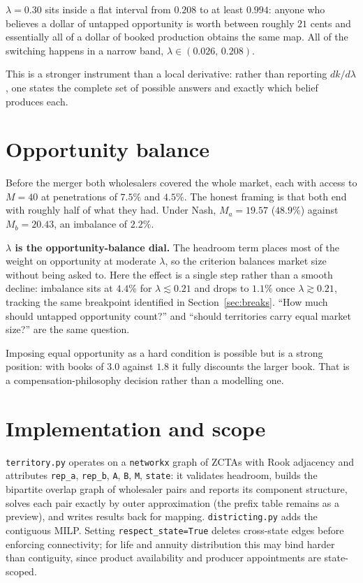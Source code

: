 \documentclass[11pt]{article}
\theoremstyle{remark}\newtheorem*{remark}{Remark}
\begin{document}
\begin{resultbox}
$\lambda=0.30$ sits inside a flat interval from $0.208$ to at least $0.994$: anyone who
believes a dollar of untapped opportunity is worth between roughly $21$ cents and
essentially all of a dollar of booked production obtains the same map. All of the
switching happens in a narrow band, $\lambda\in(0.026,\,0.208)$.
\end{resultbox}

\noindent This is a stronger instrument than a local derivative: rather than reporting
$dk/d\lambda$, one states the complete set of possible answers and exactly which belief
produces each.

\section{Opportunity balance}\label{sec:opp}
Before the merger both wholesalers covered the whole market, each with access to
$M=40$ at penetrations of $7.5\%$ and $4.5\%$. The honest framing is that both end with
roughly half of what they had. Under Nash, $M_a=19.57$ ($48.9\%$) against $M_b=20.43$,
an imbalance of $2.2\%$.

\begin{resultbox}
\textbf{$\lambda$ is the opportunity-balance dial.} The headroom term places most of the
weight on opportunity at moderate $\lambda$, so the criterion balances market size
without being asked to. Here the effect is a single step rather than a smooth decline:
imbalance sits at $4.4\%$ for $\lambda\lesssim0.21$ and drops to $1.1\%$ once
$\lambda\gtrsim0.21$, tracking the same breakpoint identified in
Section~\ref{sec:breaks}. ``How much should untapped opportunity count?'' and ``should
territories carry equal market size?'' are the same question.
\end{resultbox}

\noindent Imposing equal opportunity as a hard condition is possible but is a strong
position: with books of $3.0$ against $1.8$ it fully discounts the larger book. That is
a compensation-philosophy decision rather than a modelling one.

\section{Implementation and scope}\label{sec:impl}
\texttt{territory.py} operates on a \texttt{networkx} graph of ZCTAs with Rook adjacency
and attributes \texttt{rep\_a}, \texttt{rep\_b}, \texttt{A}, \texttt{B}, \texttt{M},
\texttt{state}: it validates headroom, builds the bipartite overlap graph of wholesaler
pairs and reports its component structure, solves each pair exactly by outer approximation
(the prefix table remains as a preview), and writes
results back for mapping. \texttt{districting.py} adds the contiguous MILP. Setting
\texttt{respect\_state=True} deletes cross-state edges before enforcing connectivity;
for life and annuity distribution this may bind harder than contiguity, since product
availability and producer appointments are state-scoped.
\end{document}

